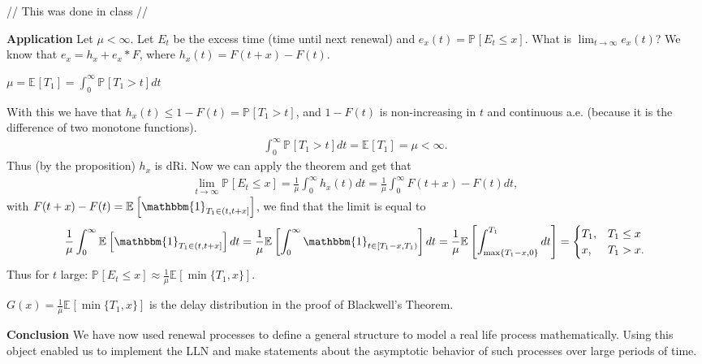 {\color{blue}
// This was done in class //

\noindent \textbf{Application} Let $\mu < \infty$. Let $E_t$ be the excess time (time until next renewal) and $e_x(t) = \mathbb{P}_{} \left[ E_t \leq x \right] $. What is $\lim_{t \to \infty} e_x(t)$? We know that $e_x = h_x + e_x*F$, where $h_x(t) = F(t+x)-F(t)$.
\begin{rmk}[]
	$\mu = \mathbb{E}_{} \left[ T_1 \right] = \int_{0}^{\infty} \mathbb{P}_{} \left[ T_1 > t \right] dt$
\end{rmk}
\noindent With this we have that $h_x(t) \leq 1 - F(t) = \mathbb{P}_{} \left[ T_1 > t \right] $, and $1-F(t)$ is non-increasing in $t$ and continuous a.e. (because it is the difference of two monotone functions). 
\begin{align}
	\int_{0}^{\infty} \mathbb{P}_{} \left[ T_1 > t \right] dt = \mathbb{E}_{} \left[ T_1 \right] = \mu < \infty .
\end{align}
Thus (by the proposition) $h_x$ is dRi. Now we can apply the theorem and get that 
\begin{align}
	\lim_{t \to \infty} \mathbb{P}_{} \left[ E_t \leq x \right] = \frac{1}{\mu } \int_{0}^{\infty} h_x(t)dt = \frac{1}{\mu } \int_{0}^{\infty} F(t+x) - F(t) dt,
\end{align}
with $F(t+x) - F(t) = \mathbb{E}_{} \left[ \mathbbm{1}_{T_1 \in (t, t+x]} \right] $, we find that the limit is equal to 
\begin{align}
	\frac{1}{\mu } \int_{0}^{\infty} \mathbb{E}_{} \left[ \mathbbm{1}_{T_1 \in (t, t+x]} \right]dt = \frac{1}{\mu} \mathbb{E}_{} \left[ \int_{0}^{ \infty } \mathbbm{1}_{t \in [T_1 -x, T_1)}    \right]dt = \frac{1}{\mu } \mathbb{E}_{} \left[ \int_{\max\{T_1-x, 0\}}^{T_1} dt \right] =  
	\begin{cases}
		T_1, & T_1 \leq x \\
		x, & T_1 > x.
	\end{cases}
\end{align}
Thus for $t$ large:  $\mathbb{P}_{} \left[ E_t \leq x \right] \approx  \frac{1}{\mu} \mathbb{E}_{} \left[ \min\{T_1, x\} \right]  $. 

\begin{rmk}[]
	$G(x) = \frac{1}{\mu } \mathbb{E}_{} \left[ \min\{T_1, x\} \right] $ is the delay distribution in the proof of Blackwell's Theorem.
\end{rmk}
}
\noindent \textbf{Conclusion} We have now used renewal processes to define a general structure to model a real life process mathematically. Using this object enabled us to implement the LLN and make statements about the asymptotic behavior of such processes over large periods of time.


